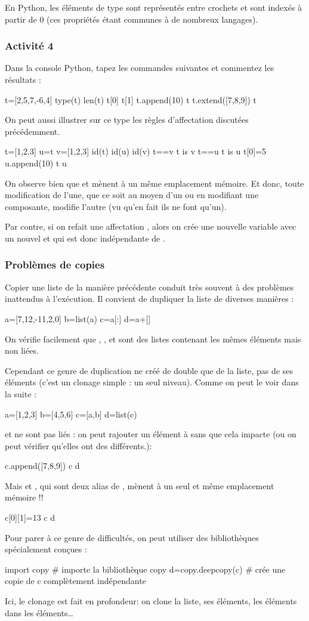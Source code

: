 \documentclass[11pt,a4paper,french,twoside]{PMCours}
\begin{document}
\medskip
En Python, les éléments de type  sont représentés entre crochets 
\code{[ ]} et sont indexés à partir de $0$ (ces propriétés étant communes à de 
nombreux langages).

\subsubsection*{Activité 4}
Dans la console Python, tapez les commandes suivantes et commentez les résultats :
\begin{Python}
t=[2,5,7,-6,4]
type(t)
len(t)
t[0]
t[1]
t.append(10)
t
t.extend([7,8,9])
t
\end{Python}
On peut aussi illustrer sur ce type les règles d'affectation discutées précédemment. 
\begin{Python}
t=[1,2,3]
u=t
v=[1,2,3]
id(t)
id(u)
id(v)
t==v
t is v
t==u
t is u
t[0]=5
u.append(10)
t
u
\end{Python}
On observe bien que  et  mènent à un même emplacement 
mémoire. Et donc, toute modification de l'une, que ce soit au moyen d'un 
 ou en modifiant une composante, modifie l'autre (vu qu'en 
fait ils ne font qu'un).

Par contre, si on refait une affectation , alors on crée une nouvelle 
variable  avec un nouvel  et qui est donc indépendante de .
\subsubsection*{Problèmes de copies}
Copier une liste de la manière précédente conduit très souvent à des problèmes
inattendus à l'exécution. Il convient de dupliquer la liste de diverses manières :    
\begin{Python}
a=[7,12,-11,2,0] 
b=list(a)
c=a[:]
d=a+[]
\end{Python}
On vérifie facilement que , ,  et  sont des 
listes contenant les mêmes éléments mais non liées.

Cependant ce genre de duplication ne créé de double que de la liste, pas de ses 
éléments (c'est un clonage simple : un seul niveau). Comme on peut le voir dans
la suite :
\begin{Python}
a=[1,2,3]
b=[4,5,6] 
c=[a,b] 
d=list(c) 
\end{Python}
 et  ne sont pas liés : on peut rajouter un élément à  
sans que cela impacte  (ou on peut vérifier qu'elles ont des  
différents.): 
\begin{Python}
c.append([7,8,9]) 
c
d
\end{Python}
Mais  et , qui sont deux alias de , mènent à un 
seul et même emplacement mémoire !! 
\begin{Python}
c[0][1]=13 
c 
d 
\end{Python}
Pour parer à ce genre de difficultés, on peut utiliser des bibliothèques 
spécialement conçues : 
\begin{Python}
import copy  # importe la bibliothèque copy
d=copy.deepcopy(c) # crée une copie de c complètement indépendante 
\end{Python}
Ici, le clonage est fait en profondeur: on clone la liste, ses éléments, les 
éléments dans les éléments\dots
\end{document}
